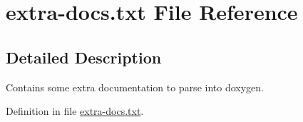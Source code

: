 \hypertarget{extra-docs_8txt}{
\section{extra-docs.txt File Reference}
\label{extra-docs_8txt}
}


\subsection{Detailed Description}
Contains some extra documentation to parse into doxygen.

Definition in file \hyperlink{extra-docs_8txt-source}{extra-docs.txt}.